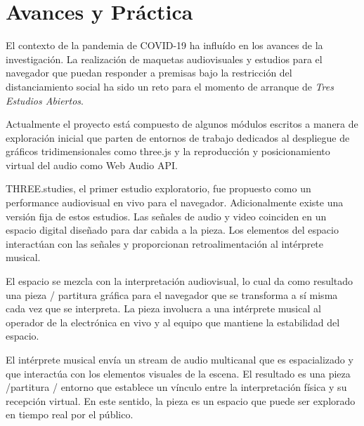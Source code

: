 \section*{Avances y Práctica}

El contexto de la pandemia de COVID-19 ha influído en los avances de la investigación. La realización de maquetas audiovisuales y estudios para el navegador que puedan responder a premisas bajo la restricción del distanciamiento social ha sido un reto para el momento de arranque de \textit{Tres Estudios Abiertos}. 

Actualmente el proyecto está compuesto de algunos módulos escritos a manera de exploración inicial que parten de entornos de trabajo dedicados al despliegue de gráficos tridimensionales como three.js y la reproducción y posicionamiento virtual del audio como Web Audio API. 




THREE.studies, el primer estudio exploratorio, fue propuesto como un performance audiovisual en vivo para el navegador. Adicionalmente existe una versión fija de estos estudios. Las señales de audio y video coinciden en un espacio digital diseñado para dar cabida a la pieza. Los elementos del espacio interactúan con las señales y proporcionan retroalimentación al intérprete musical.

El espacio se mezcla con la interpretación audiovisual, lo cual da como resultado una pieza / partitura gráfica para el navegador que se transforma a sí misma cada vez que se interpreta. La pieza involucra a una intérprete musical al operador de la electrónica en vivo y al equipo que mantiene la estabilidad del espacio. 

El intérprete musical envía un stream de audio multicanal que es espacializado y que interactúa con los elementos visuales de la escena. El resultado es una pieza /partitura / entorno que establece un vínculo entre la interpretación física y su recepción virtual. En este sentido, la pieza es un espacio que puede ser explorado en tiempo real por el público. 

